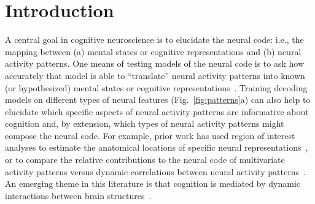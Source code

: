 \documentclass[english]{article}
\begin{document}
\section*{Introduction}
A central goal in cognitive neuroscience is to elucidate the
neural code: i.e., the mapping between (a) mental states or
cognitive representations and (b) neural activity patterns. One means
of testing models of the neural code is to ask how accurately that
model is able to ``translate'' neural activity patterns into known (or
hypothesized) mental states or cognitive
representations~\citep[e.g.,][]{HaxbEtal01, NormEtal06b, TongPrat12,
  MitcEtal08a, KamiTong05, NishEtal11, PereEtal18, HuthEtal12,
  HuthEtal16}.  Training decoding models on different types of neural
features (Fig.~\ref{fig:patterns}a) can also help to elucidate which
specific aspects of neural activity patterns are informative about
cognition and, by extension, which types of neural activity patterns
might compose the neural code.  For example, prior work has used
region of interest analyses to estimate the anatomical locations of
specific neural representations~\citep[e.g.,][]{EtzeEtal09}, or to
compare the relative contributions to the neural code of multivariate
activity patterns versus dynamic correlations between neural activity
patterns~\citep[e.g.,][]{MannEtal18, FongEtal19}.  An emerging theme
in this literature is that cognition is mediated by dynamic
interactions between brain structures~\citep{Gros88, Fris00, SporHone06, BassEtal06,
  Turk13, DemeEtal19, SoloEtal19, LuriEtal18, PretEtal17, ZouEtal19,
  MackEtal17, BresKels01, McIn00}.
\end{document}
